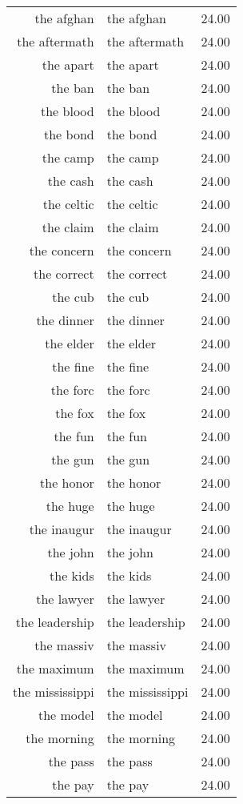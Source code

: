 \begin{table}[ht]
\begin{tabular}{rlr}
  the afghan & the afghan & 24.00 \\ 
  the aftermath & the aftermath & 24.00 \\ 
  the apart & the apart & 24.00 \\ 
  the ban & the ban & 24.00 \\ 
  the blood & the blood & 24.00 \\ 
  the bond & the bond & 24.00 \\ 
  the camp & the camp & 24.00 \\ 
  the cash & the cash & 24.00 \\ 
  the celtic & the celtic & 24.00 \\ 
  the claim & the claim & 24.00 \\ 
  the concern & the concern & 24.00 \\ 
  the correct & the correct & 24.00 \\ 
  the cub & the cub & 24.00 \\ 
  the dinner & the dinner & 24.00 \\ 
  the elder & the elder & 24.00 \\ 
  the fine & the fine & 24.00 \\ 
  the forc & the forc & 24.00 \\ 
  the fox & the fox & 24.00 \\ 
  the fun & the fun & 24.00 \\ 
  the gun & the gun & 24.00 \\ 
  the honor & the honor & 24.00 \\ 
  the huge & the huge & 24.00 \\ 
  the inaugur & the inaugur & 24.00 \\ 
  the john & the john & 24.00 \\ 
  the kids & the kids & 24.00 \\ 
  the lawyer & the lawyer & 24.00 \\ 
  the leadership & the leadership & 24.00 \\ 
  the massiv & the massiv & 24.00 \\ 
  the maximum & the maximum & 24.00 \\ 
  the mississippi & the mississippi & 24.00 \\ 
  the model & the model & 24.00 \\ 
  the morning & the morning & 24.00 \\ 
  the pass & the pass & 24.00 \\ 
  the pay & the pay & 24.00 \\ 

\end{tabular}
\end{table}
